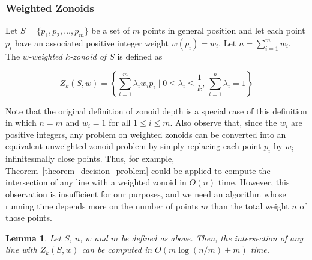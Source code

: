 \documentclass[charterfonts,lotsofwhite]{patmorin}
\newtheorem{lemma}{Lemma}
\begin{document}
\subsubsection{Weighted Zonoids}
\label{section_decision}

Let $S = \{p_1, p_2, \ldots, p_m\}$ be a set of $m$ points in general
position and let each point $p_i$ have an associated positive integer
weight $w(p_i)=w_i$.  Let $n=\sum_{i=1}^m w_i$.  The \emph{$w$-weighted
$k$-zonoid of $S$} is defined as

\[ Z_k(S,w) = \left\{\sum_{i=1}^{m}\lambda_iw_ip_i \mid 0 \le \lambda_i \le \frac{1}{k},\, \sum_{i=1}^{n} \lambda_i = 1 \right\} \]

Note that the original definition of zonoid depth is a special case of
this definition in which $n=m$ and $w_i=1$ for all $1\le i\le m$.
Also observe that, since the $w_i$ are positive integers, any problem
on weighted zonoids can be converted into an equivalent unweighted
zonoid problem by simply replacing each point $p_i$ by $w_i$
infinitesmally close points. Thus, for example,
Theorem~\ref{theorem_decision_problem} could be applied to compute the
intersection of any line with a weighted zonoid in $O(n)$ time.
However, this observation is insufficient for our purposes, and we
need an algorithm whose running time depends more on the number of
points $m$ than the total weight $n$ of those points.

\begin{lemma}
Let $S$, $n$, $w$ and $m$ be defined as above.  Then, the intersection
of any line with $Z_k(S,w)$ can be computed in $O(m\log (n/m) + m)$
time.
\end{lemma}
\end{document}
